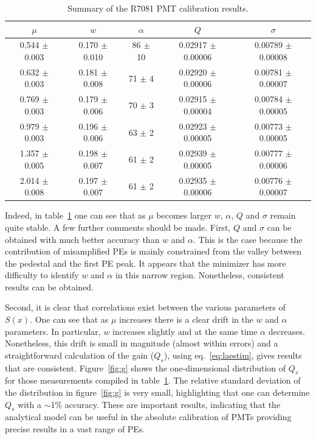 \documentclass[preprint,12pt]{elsarticle}
\begin{document}
\begin{table}[t!]
\footnotesize
\centering
\begin{tabular}{| c  || c | c | c | c |}
\hline 
$\mu$  &  $w$ &  $\alpha$ &  $Q$ &  $\sigma$ \\[0.6ex] \hline\hline %
  0.544 $\pm$ 0.003 & 0.170 $\pm$  0.010 &  86 $\pm$ 10 & 0.02917  $\pm$ 0.00006 &  0.00789 $\pm$ 0.00008 \\ %
  0.632 $\pm$ 0.003 & 0.181 $\pm$  0.008 &  71 $\pm$ 4   & 0.02920  $\pm$ 0.00006 &  0.00781 $\pm$ 0.00007 \\ %
  0.769 $\pm$ 0.003 & 0.179 $\pm$  0.006 &  70 $\pm$ 3   & 0.02915  $\pm$ 0.00004 &  0.00784 $\pm$ 0.00005 \\ %
 0.979  $\pm$ 0.003 & 0.196 $\pm$  0.006 &  63 $\pm$ 2   & 0.02923  $\pm$ 0.00005 &  0.00773 $\pm$ 0.00005 \\ %
 1.357  $\pm$ 0.005 & 0.198 $\pm$  0.007 &  61 $\pm$ 2   & 0.02939  $\pm$ 0.00005 &  0.00777 $\pm$ 0.00006 \\ %
 2.014 $\pm$  0.008 & 0.197 $\pm$  0.007 &  61 $\pm$ 2   & 0.02935  $\pm$ 0.00006 &  0.00776 $\pm$ 0.00007 %
\\[0.6ex] \hline\hline
\end{tabular}
\caption{Summary of the R7081 PMT calibration results.}
\label{tab:money}
\end{table}

Indeed, in table~\ref{tab:money} one can see that as $\mu$ becomes larger $w$, $\alpha$, $Q$ and $\sigma$ remain quite stable. %
A few further comments should be made. 
First, $Q$ and $\sigma$ can be obtained with much better accuracy than $w$ and $\alpha$. 
This is the case because the contribution of misamplified PEs is mainly constrained from the valley between the pedestal and the first PE peak. 
It appears that the minimizer has more difficulty to identify $w$ and $\alpha$ in this narrow region. 
Nonetheless, consistent results can be obtained. 

Second, it is clear that correlations exist between the various parameters of $S(x)$. 
One can see that as $\mu$ increases there is a clear drift in the $w$ and $\alpha$ parameters. 
In particular, $w$ increases slightly and at the same time $\alpha$ decreases. 
Nonetheless, this drift is small in magnitude (almost within errors) and a straightforward calculation of the gain ($Q_s$), using eq.~\eqref{eq:laestim}, gives results that are consistent. 
Figure~\ref{fig:g} shows the one-dimensional distribution of $Q_s$ for those measurements compiled in table~\ref{tab:money}. 
The relative standard deviation of the distribution in figure~\ref{fig:g} is very small, highlighting that one can determine $Q_s$ with a $\sim$1\% accuracy. 
These are important results, indicating that the analytical model can be useful in the absolute calibration of PMTs providing precise results in a vast range of PEs.
\end{document}
